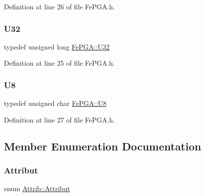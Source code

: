 Definition at line 26 of file Fe\+P\+G\+A.\+h.

\mbox{\label{classFePGA_a1d44a0b27d13179bb1dceb5ec6f4cc1f}} 
\subsubsection{\texorpdfstring{U32}{U32}}
{\footnotesize\ttfamily typedef unsigned long \hyperlink{classFePGA_a1d44a0b27d13179bb1dceb5ec6f4cc1f}{Fe\+P\+G\+A\+::\+U32}}



Definition at line 25 of file Fe\+P\+G\+A.\+h.

\mbox{\label{classFePGA_ab65d84dbbc4b5711eb4d85d00c5abfa2}} 
\subsubsection{\texorpdfstring{U8}{U8}}
{\footnotesize\ttfamily typedef unsigned char \hyperlink{classFePGA_ab65d84dbbc4b5711eb4d85d00c5abfa2}{Fe\+P\+G\+A\+::\+U8}}



Definition at line 27 of file Fe\+P\+G\+A.\+h.



\subsection{Member Enumeration Documentation}
\mbox{\label{classAttrib_a69e171d7cc6417835a5a306d3c764235}} 
\subsubsection{\texorpdfstring{Attribut}{Attribut}}
{\footnotesize\ttfamily enum \hyperlink{classAttrib_a69e171d7cc6417835a5a306d3c764235}{Attrib\+::\+Attribut}\hspace{0.3cm}{\ttfamily [inherited]}}

